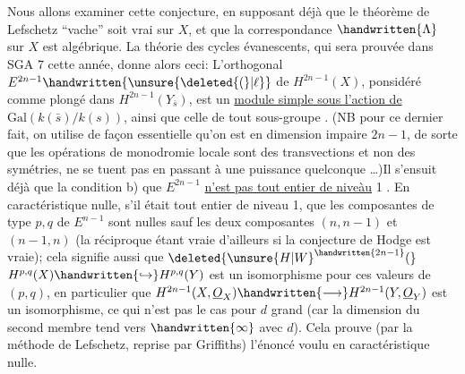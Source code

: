 Nous allons examiner cette conjecture, en supposant déjà que le  théorème de Lefschetz ``vache'' soit vrai sur $X$, et que la correspondance $\handwritten{\Lambda}$ sur $X$ est algébrique. La théorie des cycles évanescents, qui sera prouvée dans SGA 7 cette année, donne alors ceci: L'orthogonal $E^{2n-1}\handwritten{\unsure{\deleted{(}|\ell}}$ de $H^{2n-1}(X)$, ponsidéré comme plongé dans $H^{2n-1}(Y_{\bar s})$, est un \uline{module simple sous l'action de} $\mathrm{Gal}(k(\bar s)/k(s))$, ainsi que  celle de tout sous-groupe . (NB pour ce dernier fait, on utilise de façon essentielle qu'on est en dimension impaire $2n-1$, de sorte que les opérations de monodromie locale sont des transvections et non des symétries,  ne se tuent pas en passant à une puissance quelconque \ldots)Il s'ensuit déjà que  la condition b) que $E^{2n-1}$ \uline{n'est pas tout entier de niveàu} 1 . En caractéristique nulle,  s'il était tout entier de niveau 1,  que les composantes de type $p,q$ de $E^{n-1}$ sont nulles sauf les deux composantes $(n,n-1)$ et $(n-1,n)$ (la réciproque étant vraie d'ailleurs si la conjecture de Hodge est vraie); cela  signifie aussi que $\deleted{{\unsure{H|W}}^{\handwritten{2n-1}}(}$ $H^{p,q}(X)\handwritten{\hookrightarrow}H^{p,q}(Y)$ est un isomorphisme pour ces valeurs de $(p,q)$, en particulier que  $H^{2n-1}(X,\underline{O}_X)\handwritten{\longrightarrow}H^{2n-1}(Y,\underline{O}_Y)$ est un isomorphisme, ce qui n'est pas le cas pour $d$ grand (car la dimension du second membre tend vers $\handwritten{\infty}$ avec $d$). Cela prouve (par la méthode de Lefschetz, reprise par Griffiths) l'énoncé voulu en caractéristique nulle.

